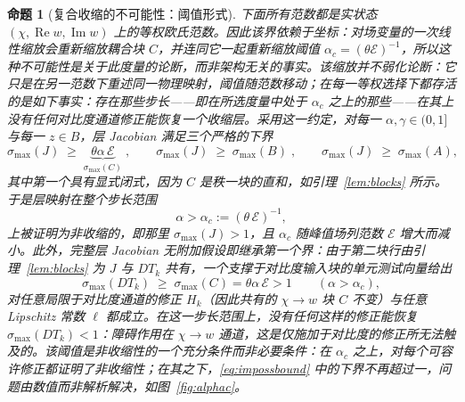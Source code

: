 \documentclass[UTF8,a4paper,11pt]{ctexart}
\newtheorem{Proposition}{命题}[section]
\begin{document}
\begin{Proposition}[复合收缩的不可能性：阈值形式]\label{prop:imposs}
下面所有范数都是实状态 $(\chi,\operatorname{Re}w,\operatorname{Im}w)$ 上的等权欧氏范数。因此该界依赖于坐标：对场变量的一次线性缩放会重新缩放耦合块 $C$，并连同它一起重新缩放阈值 $\alpha_c=(\theta\mathcal{E})^{-1}$，所以这种不可能性是关于此度量的论断，而非架构无关的事实。该缩放并不弱化论断：它只是在另一范数下重述同一物理映射，阈值随范数移动；在每一等权选择下都存活的是如下事实：存在那些步长——即在所选度量中处于 $\alpha_c$ 之上的那些——在其上没有任何对比度通道修正能恢复一个收缩层。采用这一约定，对每一 $\alpha,\gamma\in(0,1]$ 与每一 $z\in B$，层 Jacobian 满足三个\emph{严格的}下界
\begin{equation}\label{eq:impossbound}
\sigma_{\max}(J)\;\ge\;\underbrace{\theta\alpha\,\mathcal{E}}_{\sigma_{\max}(C)}\;,
\qquad
\sigma_{\max}(J)\;\ge\;\sigma_{\max}(B)\;,\qquad
\sigma_{\max}(J)\;\ge\;\sigma_{\max}(A),
\end{equation}
其中第一个具有显式闭式，因为 $C$ 是秩一块的直和，如引理~\ref{lem:blocks} 所示。于是层映射在整个步长范围
\begin{equation}\label{eq:alphac}
\alpha>\alpha_c:=(\theta\,\mathcal{E})^{-1},
\end{equation}
上被证明为非收缩的，即那里 $\sigma_{\max}(J)>1$，且 $\alpha_c$ 随峰值场列范数 $\mathcal{E}$ 增大而减小。此外，\emph{完整}层 Jacobian 无附加假设即继承第一个界：由于第二块行由引理~\ref{lem:blocks} 为 $J$ 与 $DT_k$ 共有，一个支撑于对比度输入块的单元测试向量给出
\begin{equation}\label{eq:imposscomp}
\sigma_{\max}(DT_k)\;\ge\;\sigma_{\max}(C)=\theta\alpha\,\mathcal{E}>1
\qquad(\alpha>\alpha_c),
\end{equation}
对任意局限于对比度通道的修正 $H_k$（因此共有的 $\chi\!\to\!w$ 块 $C$ 不变）与任意 Lipschitz 常数 $\ell$ 都成立。在这一步长范围上，没有任何这样的修正能恢复 $\sigma_{\max}(DT_k)<1$：障碍作用在 $\chi\!\to\!w$ 通道，这是仅施加于对比度的修正所无法触及的。该阈值是非收缩性的一个\emph{充分}条件而非必要条件：在 $\alpha_c$ 之上，对每个可容许修正都证明了非收缩性；在其之下，\eqref{eq:impossbound} 中的下界不再超过一，问题由数值而非解析解决，如图~\ref{fig:alphac}。
\end{Proposition}
\end{document}
